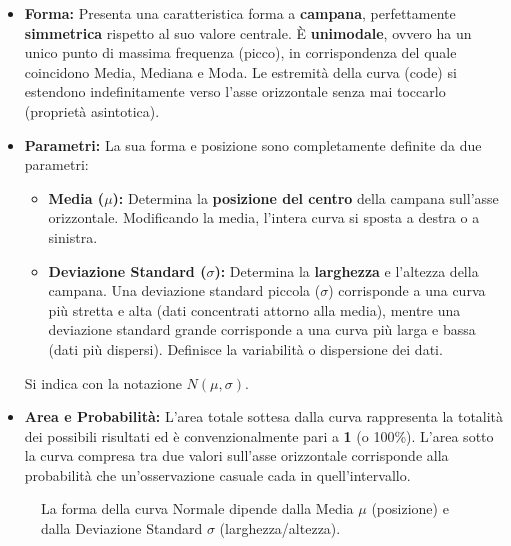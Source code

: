 \documentclass[12pt, a4paper]{article}
\newcommand{\popmean}{\mu} %
\newcommand{\popsd}{\sigma} %
\begin{document}
\begin{itemize}
    \item \textbf{Forma:} Presenta una caratteristica forma a \textbf{campana}, perfettamente \textbf{simmetrica} rispetto al suo valore centrale. È \textbf{unimodale}, ovvero ha un unico punto di massima frequenza (picco), in corrispondenza del quale coincidono Media, Mediana e Moda. Le estremità della curva (code) si estendono indefinitamente verso l'asse orizzontale senza mai toccarlo (proprietà asintotica).
    \item \textbf{Parametri:} La sua forma e posizione sono completamente definite da due parametri:
        \begin{itemize}
            \item \textbf{Media ($\popmean$):} Determina la \textbf{posizione del centro} della campana sull'asse orizzontale. Modificando la media, l'intera curva si sposta a destra o a sinistra.
            \item \textbf{Deviazione Standard ($\popsd$):} Determina la \textbf{larghezza} e l'altezza della campana. Una deviazione standard piccola ($\popsd$) corrisponde a una curva più stretta e alta (dati concentrati attorno alla media), mentre una deviazione standard grande corrisponde a una curva più larga e bassa (dati più dispersi). Definisce la variabilità o dispersione dei dati.
        \end{itemize}
        Si indica con la notazione $N(\popmean, \popsd)$.
    \item \textbf{Area e Probabilità:} L'area totale sottesa dalla curva rappresenta la totalità dei possibili risultati ed è convenzionalmente pari a \textbf{1} (o 100\%). L'area sotto la curva compresa tra due valori sull'asse orizzontale corrisponde alla probabilità che un'osservazione casuale cada in quell'intervallo.
\end{itemize}


\begin{figure}[ht]
\centering
{}
\caption{La forma della curva Normale dipende dalla Media $\mu$ (posizione) e dalla Deviazione Standard $\sigma$ (larghezza/altezza).}
\label{fig:normale_shape}
\end{figure}
\end{document}
